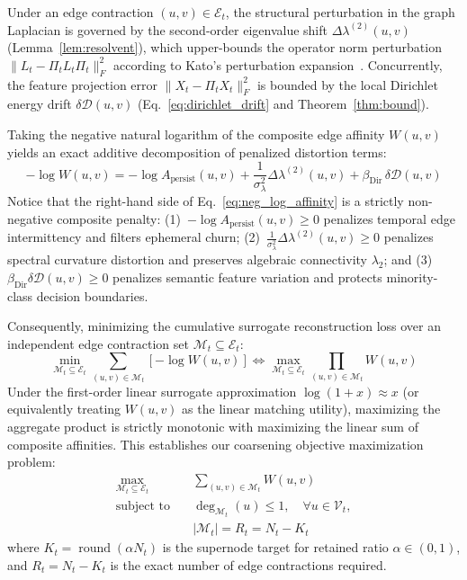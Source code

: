 \documentclass[sigconf]{acmart}
\begin{document}
Under an edge contraction $(u, v) \in \mathcal{E}_t$, the structural perturbation in the graph Laplacian is governed by the second-order eigenvalue shift $\Delta \lambda^{(2)}(u, v)$ (Lemma~\ref{lem:resolvent}), which upper-bounds the operator norm perturbation $\|L_t - \Pi_t L_t \Pi_t\|_F^2$ according to Kato's perturbation expansion~\cite{kato1995perturbation}. Concurrently, the feature projection error $\|X_t - \Pi_t X_t\|_F^2$ is bounded by the local Dirichlet energy drift $\delta \mathcal{D}(u, v)$ (Eq.~\eqref{eq:dirichlet_drift} and Theorem~\ref{thm:bound}).

Taking the negative natural logarithm of the composite edge affinity $W(u, v)$ yields an exact additive decomposition of penalized distortion terms:
\begin{equation}
\label{eq:neg_log_affinity}
-\log W(u, v) = -\log A_{\text{persist}}(u, v) + \frac{1}{\sigma_\lambda^2} \Delta \lambda^{(2)}(u, v) + \beta_{\text{Dir}} \, \delta \mathcal{D}(u, v)
\end{equation}
Notice that the right-hand side of Eq.~\eqref{eq:neg_log_affinity} is a strictly non-negative composite penalty:
(1)~$-\log A_{\text{persist}}(u, v) \ge 0$ penalizes temporal edge intermittency and filters ephemeral churn;
(2)~$\frac{1}{\sigma_\lambda^2} \Delta \lambda^{(2)}(u, v) \ge 0$ penalizes spectral curvature distortion and preserves algebraic connectivity $\lambda_2$; and
(3)~$\beta_{\text{Dir}} \delta \mathcal{D}(u, v) \ge 0$ penalizes semantic feature variation and protects minority-class decision boundaries.

Consequently, minimizing the cumulative surrogate reconstruction loss over an independent edge contraction set $\mathcal{M}_t \subseteq \mathcal{E}_t$:
\begin{equation}
\label{eq:loss_equiv}
\min_{\mathcal{M}_t \subseteq \mathcal{E}_t} \sum_{(u, v) \in \mathcal{M}_t} \left[ -\log W(u, v) \right] \iff \max_{\mathcal{M}_t \subseteq \mathcal{E}_t} \prod_{(u, v) \in \mathcal{M}_t} W(u, v)
\end{equation}
Under the first-order linear surrogate approximation $\log(1 + x) \approx x$ (or equivalently treating $W(u, v)$ as the linear matching utility), maximizing the aggregate product is strictly monotonic with maximizing the linear sum of composite affinities. This establishes our coarsening objective maximization problem:
\begin{equation}
\label{eq:matching_opt}
\begin{aligned}
\max_{\mathcal{M}_t \subseteq \mathcal{E}_t} & \quad \sum_{(u, v) \in \mathcal{M}_t} W(u, v) \\
\text{subject to} & \quad \operatorname{deg}_{\mathcal{M}_t}(u) \le 1, \quad \forall u \in \mathcal{V}_t, \\
& \quad |\mathcal{M}_t| = R_t = N_t - K_t
\end{aligned}
\end{equation}
where $K_t = \operatorname{round}(\alpha N_t)$ is the supernode target for retained ratio $\alpha \in (0, 1)$, and $R_t = N_t - K_t$ is the exact number of edge contractions required.
\end{document}
